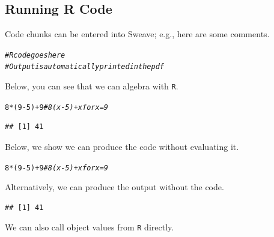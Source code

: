 \documentclass{article}\usepackage[]{graphicx}\usepackage[]{xcolor}
\makeatletter
\newcommand{\hlnum}[1]{\textcolor[rgb]{0.686,0.059,0.569}{#1}}%
\newcommand{\hlcom}[1]{\textcolor[rgb]{0.678,0.584,0.686}{\textit{#1}}}%
\newcommand{\hlopt}[1]{\textcolor[rgb]{0,0,0}{#1}}%
\newcommand{\hldef}[1]{\textcolor[rgb]{0.345,0.345,0.345}{#1}}%
\newenvironment{kframe}{%
 \def\at@end@of@kframe{}%
 \ifinner\ifhmode%
  \def\at@end@of@kframe{\end{minipage}}%
  \begin{minipage}{\columnwidth}%
 \fi\fi%
 \def\FrameCommand##1{\hskip\@totalleftmargin \hskip-\fboxsep
 \colorbox{shadecolor}{##1}\hskip-\fboxsep
     \hskip-\linewidth \hskip-\@totalleftmargin \hskip\columnwidth}%
 \MakeFramed {\advance\hsize-\width
   \@totalleftmargin\z@ \linewidth\hsize
   \@setminipage}}%
 {\par\unskip\endMakeFramed%
 \at@end@of@kframe}
\newenvironment{knitrout}{}{} %
\makeatother
\begin{document}
\begin{multicols}{2}
\subsection{Running R Code}
Code chunks can be entered into Sweave; e.g., here are some comments.
\begin{knitrout}\scriptsize
{}\color{fgcolor}\begin{kframe}
\begin{alltt}
\hlcom{# R code goes here}
\hlcom{# Output is automatically printed in the pdf}
\end{alltt}
\end{kframe}
\end{knitrout}
Below, you can see that we can algebra with \texttt{R}.
\begin{knitrout}\scriptsize
{}\color{fgcolor}\begin{kframe}
\begin{alltt}
\hlnum{8}\hlopt{*}\hldef{(}\hlnum{9}\hlopt{-}\hlnum{5}\hldef{)} \hlopt{+} \hlnum{9} \hlcom{# 8(x-5) + x for x=9}
\end{alltt}
\begin{verbatim}
## [1] 41
\end{verbatim}
\end{kframe}
\end{knitrout}
Below, we show we can produce the code without evaluating it.
\begin{knitrout}\scriptsize
{}\color{fgcolor}\begin{kframe}
\begin{alltt}
\hlnum{8}\hlopt{*}\hldef{(}\hlnum{9}\hlopt{-}\hlnum{5}\hldef{)} \hlopt{+} \hlnum{9} \hlcom{# 8(x-5) + x for x=9}
\end{alltt}
\end{kframe}
\end{knitrout}
Alternatively, we can produce the output without the code.
\begin{knitrout}\scriptsize
{}\color{fgcolor}\begin{kframe}
\begin{verbatim}
## [1] 41
\end{verbatim}
\end{kframe}
\end{knitrout}
We can also call object values from \texttt{R} directly.
\begin{knitrout}\scriptsize

\end{knitrout}
\end{multicols}
\end{document}
